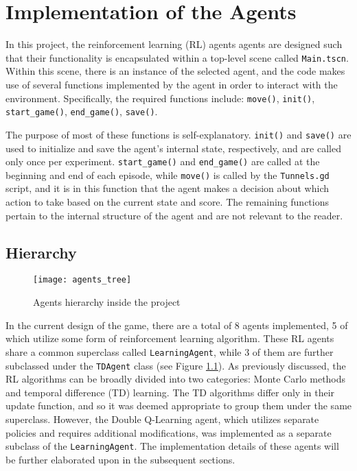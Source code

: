 \chapter{Implementation of the Agents}
\label{implOfAgents}
In this project, the reinforcement learning (RL) agents agents are designed such that their functionality is encapsulated within a top-level scene called \texttt{Main.tscn}. Within this scene, there is an instance of the selected agent, and the code makes use of several functions implemented by the agent in order to interact with the environment. Specifically, the required functions include: \texttt{move()}, \texttt{init()}, \texttt{start\_game()}, \texttt{end\_game()}, \texttt{save()}.

The purpose of most of these functions is self-explanatory. \texttt{init()} and \texttt{save()} are used to initialize and save the agent's internal state, respectively, and are called only once per experiment. \texttt{start\_game()} and \texttt{end\_game()} are called at the beginning and end of each episode, while \texttt{move()} is called by the \texttt{Tunnels.gd} script, and it is in this function that the agent makes a decision about which action to take based on the current state and score. The remaining functions pertain to the internal structure of the agent and are not relevant to the reader.

\section{Hierarchy}
\begin{figure}[h]
    \centering
    \texttt{[image: agents\_tree]}
    \caption{Agents hierarchy inside the project}
    \label{fig:agents_tree}
\end{figure}

In the current design of the game, there are a total of 8 agents implemented, 5 of which utilize some form of reinforcement learning algorithm. These RL agents share a common superclass called \texttt{LearningAgent}, while 3 of them are further subclassed under the \texttt{TDAgent} class (see Figure \ref{fig:agents_tree}). As previously discussed, the RL algorithms can be broadly divided into two categories: Monte Carlo methods and temporal difference (TD) learning. The TD algorithms differ only in their update function, and so it was deemed appropriate to group them under the same superclass. However, the Double Q-Learning agent, which utilizes separate policies and requires additional modifications, was implemented as a separate subclass of the \texttt{LearningAgent}. The implementation details of these agents will be further elaborated upon in the subsequent sections. 

